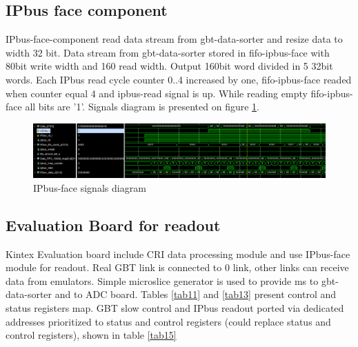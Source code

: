\documentclass{article}
\begin{document}
\subsection{IPbus face component}
IPbus-face-component read data stream from gbt-data-sorter and resize data to width 32 bit. Data stream from gbt-data-sorter stored in fifo-ipbus-face with 80bit write width and 160 read width. Output 160bit word divided in 5 32bit words. Each IPbus read cycle counter 0..4 increased by one, fifo-ipbus-face readed when counter equal 4 and ipbus-read signal is up. While reading empty fifo-ipbus-face all bits are '1'. Signals diagram is presented on figure \ref{fig:11}.

\begin{figure}[H]
	\centering 
	\includegraphics[width=1.0\textwidth]{ipbus-face-waves.png}
	\caption{\label{fig:11} IPbus-face signals diagram }
\end{figure}


\subsection{Evaluation Board for readout}

Kintex Evaluation board include CRI data processing module and use IPbus-face module for readout. Real GBT link is connected to 0 link, other links can receive data from emulators. Simple microslice generator is used to provide ms to gbt-data-sorter and to ADC board. Tables \ref{tab11} and \ref{tab13} present control and status registers map. GBT slow control and IPbus readout ported via dedicated addresses prioritized to status and control registers (could replace status and control registers), shown in table \ref{tab15} 
\end{document}
